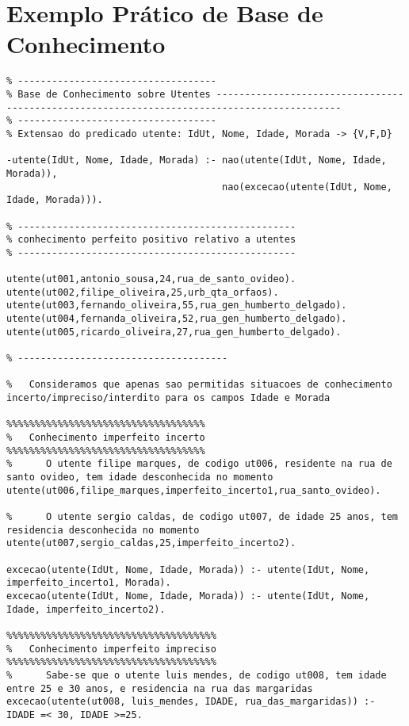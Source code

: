 \documentclass[
  oneside,
  10pt, a4paper,
  footinclude=true,
  headinclude=true,
  cleardoublepage=empty
]{scrbook}
\begin{document}
\section{Exemplo Prático de Base de Conhecimento}
	\label{base_conhecimento_anexo}
	\begin{lstlisting}	
% -----------------------------------
% Base de Conhecimento sobre Utentes --------------------------------------------------------------------------------------------
% -----------------------------------
% Extensao do predicado utente: IdUt, Nome, Idade, Morada -> {V,F,D}

-utente(IdUt, Nome, Idade, Morada) :- nao(utente(IdUt, Nome, Idade, Morada)),
                                      nao(excecao(utente(IdUt, Nome, Idade, Morada))).

% -------------------------------------------------
% conhecimento perfeito positivo relativo a utentes
% -------------------------------------------------

utente(ut001,antonio_sousa,24,rua_de_santo_ovideo).
utente(ut002,filipe_oliveira,25,urb_qta_orfaos).
utente(ut003,fernando_oliveira,55,rua_gen_humberto_delgado).
utente(ut004,fernanda_oliveira,52,rua_gen_humberto_delgado).
utente(ut005,ricardo_oliveira,27,rua_gen_humberto_delgado).

% -------------------------------------

%   Consideramos que apenas sao permitidas situacoes de conhecimento incerto/impreciso/interdito para os campos Idade e Morada

%%%%%%%%%%%%%%%%%%%%%%%%%%%%%%%%%%%
%   Conhecimento imperfeito incerto
%%%%%%%%%%%%%%%%%%%%%%%%%%%%%%%%%%%
%      O utente filipe marques, de codigo ut006, residente na rua de santo ovideo, tem idade desconhecida no momento
utente(ut006,filipe_marques,imperfeito_incerto1,rua_santo_ovideo).

%      O utente sergio caldas, de codigo ut007, de idade 25 anos, tem residencia desconhecida no momento
utente(ut007,sergio_caldas,25,imperfeito_incerto2).

excecao(utente(IdUt, Nome, Idade, Morada)) :- utente(IdUt, Nome, imperfeito_incerto1, Morada).
excecao(utente(IdUt, Nome, Idade, Morada)) :- utente(IdUt, Nome, Idade, imperfeito_incerto2).

%%%%%%%%%%%%%%%%%%%%%%%%%%%%%%%%%%%%%
%   Conhecimento imperfeito impreciso
%%%%%%%%%%%%%%%%%%%%%%%%%%%%%%%%%%%%%
%      Sabe-se que o utente luis mendes, de codigo ut008, tem idade entre 25 e 30 anos, e residencia na rua das margaridas
excecao(utente(ut008, luis_mendes, IDADE, rua_das_margaridas)) :- IDADE =< 30, IDADE >=25.


\end{lstlisting}
\end{document}
